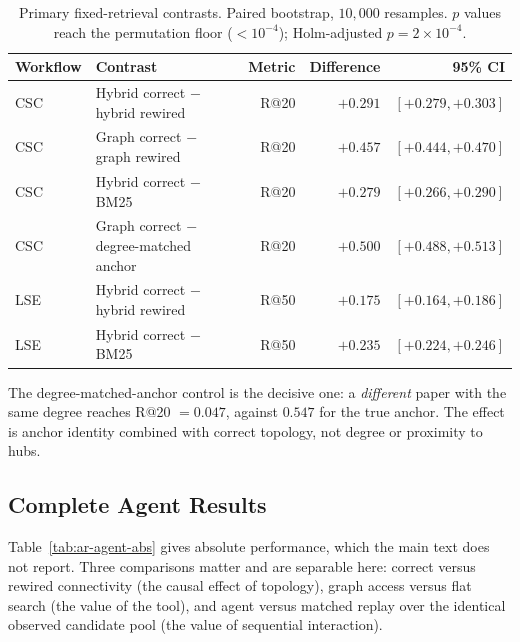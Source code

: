 \begin{table}[t]
\centering
\small
\caption{Primary fixed-retrieval contrasts. Paired bootstrap, $10{,}000$ resamples.
$p$ values reach the permutation floor ($<10^{-4}$); Holm-adjusted $p=2{\times}10^{-4}$.}
\label{tab:ar-fixed-comp}
\begin{tabular}{llrrr}
\toprule
Workflow & Contrast & Metric & Difference & 95\% CI \\
\midrule
CSC & Hybrid correct $-$ hybrid rewired & R@20 & $+0.291$ & $[+0.279, +0.303]$ \\
CSC & Graph correct $-$ graph rewired & R@20 & $+0.457$ & $[+0.444, +0.470]$ \\
CSC & Hybrid correct $-$ BM25 & R@20 & $+0.279$ & $[+0.266, +0.290]$ \\
CSC & Graph correct $-$ degree-matched anchor & R@20 & $+0.500$ & $[+0.488, +0.513]$ \\
LSE & Hybrid correct $-$ hybrid rewired & R@50 & $+0.175$ & $[+0.164, +0.186]$ \\
LSE & Hybrid correct $-$ BM25 & R@50 & $+0.235$ & $[+0.224, +0.246]$ \\
\bottomrule
\end{tabular}
\end{table}

The degree-matched-anchor control is the decisive one: a \emph{different} paper with the same degree
reaches R@20 $=0.047$, against $0.547$ for the true anchor. The effect is anchor identity combined
with correct topology, not degree or proximity to hubs.

\subsection{Complete Agent Results}
\label{appendix:ar-agents}

Table~\ref{tab:ar-agent-abs} gives absolute performance, which the main text does not report. Three
comparisons matter and are separable here: correct versus rewired connectivity (the causal effect of
topology), graph access versus flat search (the value of the tool), and agent versus matched replay
over the identical observed candidate pool (the value of sequential interaction).

